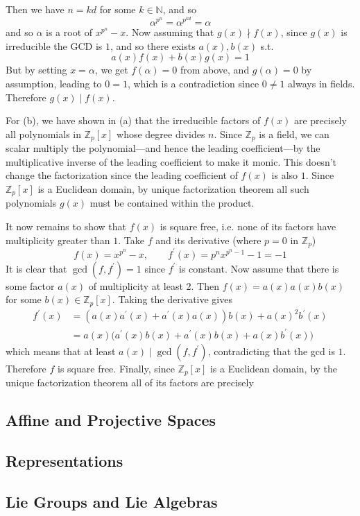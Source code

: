 \begin{solution}
\begin{enumerate}
        Then we have $n = kd$ for some $k \in \mathbb{N}$, and so 
      \begin{equation}
        \alpha^{p^n} = \alpha^{p^{kd}} = \alpha
      \end{equation} 
      and so $\alpha$ is a root of $x^{p^n} - x$. Now assuming that $g(x) \nmid f(x)$, since $g(x)$ is irreducible the GCD is $1$, and so there exists $a(x), b(x)$ s.t. 
      \begin{equation}
        a(x) f(x) + b(x) g(x) = 1
      \end{equation}
      But by setting $x = \alpha$, we get $f(\alpha) = 0$ from above, and $g(\alpha) = 0$ by assumption, leading to $0 = 1$, which is a contradiction since $0 \neq 1$ always in fields. Therefore $g(x) \mid f(x)$. 
    \end{enumerate} 

    For (b), we have shown in (a) that the irreducible factors of $f(x)$ are precisely all polynomials in $\mathbb{Z}_p [x]$ whose degree divides $n$. Since $\mathbb{Z}_p$ is a field, we can scalar multiply the polynomial---and hence the leading coefficient---by the multiplicative inverse of the leading coefficient to make it monic. This doesn't change the factorization since the leading coefficient of $f(x)$ is also $1$. Since $\mathbb{Z}_p [x]$ is a Euclidean domain, by unique factorization theorem all such polynomials $g(x)$ must be contained within the product. 

    It now remains to show that $f(x)$ is square free, i.e. none of its factors have multiplicity greater than $1$. Take $f$ and its derivative (where $p = 0$ in $\mathbb{Z}_p$)
    \begin{equation}
      f(x) = x^{p^n} - x, \qquad f^\prime (x) = p^n x^{p^n - 1} - 1 = -1
    \end{equation}
    It is clear that $\gcd(f, f^\prime) = 1$ since $f^\prime$ is constant. Now assume that there is some factor $a(x)$ of multiplicity at least 2. Then $f(x) = a(x) a(x) b(x)$ for some $b(x) \in \mathbb{Z}_p [x]$. Taking the derivative gives 
    \begin{align}
      f^\prime (x) & = ( a(x) a^\prime (x) + a^\prime (x) a(x) ) b(x) + a(x)^2 b^\prime (x) \\
                   & =  a (x) \big( a^\prime (x) b(x) + a^\prime (x) b(x) + a(x) b^\prime (x) \big) 
    \end{align}
    which means that at least $a(x) \mid \gcd(f, f^\prime)$, contradicting that the gcd is $1$. Therefore $f$ is square free. Finally, since $\mathbb{Z}_p [x]$ is a Euclidean domain, by the unique factorization theorem all of its factors are precisely 
  \end{solution}

\subsection{Affine and Projective Spaces}

\subsection{Representations}

\subsection{Lie Groups and Lie Algebras}



